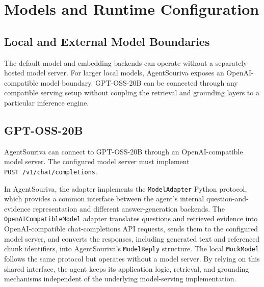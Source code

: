 
\section{Models and Runtime Configuration}

\subsection{Local and External Model Boundaries}

The default model and embedding backends can operate without a separately hosted model server. For larger local models, AgentSouriva exposes an OpenAI-compatible model boundary. GPT-OSS-20B can be connected through any compatible serving setup without coupling the retrieval and grounding layers to a particular inference engine.

\subsection{GPT-OSS-20B}

AgentSouriva can connect to GPT-OSS-20B through an OpenAI-compatible model server. The configured model server must implement \texttt{POST\ /v1/chat/completions}.



In AgentSouriva, the adapter implements the \texttt{ModelAdapter} Python protocol, which provides a common interface between the agent's internal question-and-evidence representation and different answer-generation backends. The \texttt{OpenAICompatibleModel} adapter translates questions and retrieved evidence into OpenAI-compatible chat-completions API requests, sends them to the configured model server, and converts the responses, including generated text and referenced chunk identifiers, into AgentSouriva's \texttt{ModelReply} structure. The local \texttt{MockModel} follows the same protocol but operates without a model server. By relying on this shared interface, the agent keeps its application logic, retrieval, and grounding mechanisms independent of the underlying model-serving implementation.

